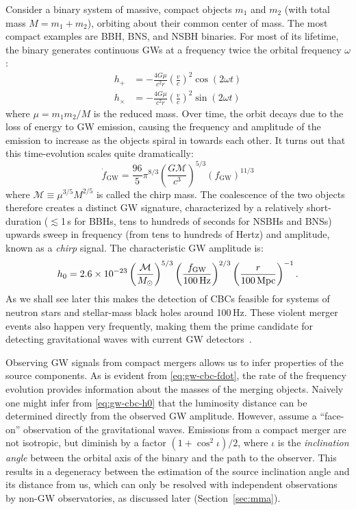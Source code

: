 Consider a binary system of massive, compact objects $m_1$ and $m_2$ (with total mass $M = m_1 + m_2$), orbiting about their common center of mass.
The most compact examples are \ac{BBH}, \ac{BNS}, and \ac{NSBH} binaries.
For most of its lifetime, the binary generates continuous \acp{GW} at a frequency twice the orbital frequency $\omega$:
\begin{align}
	\label{eq:gw-cbc-hplus}
	h_+ &= -\frac{4 G \mu}{c^2 r} \left(\frac{v}{c}\right)^2 \cos (2 \omega t) \\
	\label{eq:gw-cbc-hcross}
	h_{\times} &= -\frac{4 G \mu}{c^2 r} \left(\frac{v}{c}\right)^2 \sin (2 \omega t)
\end{align}
where $\mu = m_1 m_2 / M$ is the reduced mass.
Over time, the orbit decays due to the loss of energy to \ac{GW} emission, causing the frequency and amplitude of the emission to increase as the objects spiral in towards each other.
It turns out that this time-evolution scales quite dramatically:
\begin{equation}\label{eq:gw-cbc-fdot}
	\dot{f}_{\textrm{GW}} = \frac{96}{5}\pi^{8/3} \left(\frac{G \mathcal{M}}{c^3}\right)^{5/3} (f_{\textrm{GW}})^{11/3}
\end{equation}
where $\mathcal{M} \equiv \mu^{3/5} M^{2/5}$ is called the chirp mass.
The coalescence of the two objects therefore creates a distinct \ac{GW} signature, characterized by a relatively short-duration ($\lesssim$1\,s for \acp{BBH}, tens to hundreds of seconds for \acp{NSBH} and \acp{BNS}) upwards sweep in frequency (from tens to hundreds of Hertz) and amplitude, known as a \textit{chirp} signal.
The characteristic GW amplitude is:
\begin{equation}\label{eq:gw-cbc-h0}
	h_0 = 2.6 \times 10^{-23} \left( \frac{\mathcal{M}}{M_{\odot}} \right)^{5/3} \left( \frac{f_{\mathrm{GW}}}{100\,\mathrm{Hz}} \right)^{2/3} \left( \frac{r}{100\,\mathrm{Mpc}} \right)^{-1}.
\end{equation}
As we shall see later this makes the detection of \acp{CBC} feasible for systems of neutron stars and stellar-mass black holes around 100\,Hz.
These violent merger events also happen very frequently, making them the prime candidate for detecting gravitational waves with current GW detectors~\cite{aLIGO_prospects}.

Observing GW signals from compact mergers allows us to infer properties of the source components.
As is evident from \cref{eq:gw-cbc-fdot}, the rate of the frequency evolution provides information about the masses of the merging objects.
Naively one might infer from \cref{eq:gw-cbc-h0} that the luminosity distance can be determined directly from the observed GW amplitude.
However,  assume a ``face-on'' observation of the gravitational waves.
Emissions from a compact merger are not isotropic, but diminish by a factor $(1 + \cos^2 \iota) / 2$, where $\iota$ is the \textit{inclination angle} between the orbital axis of the binary and the path to the observer.
This results in a degeneracy between the estimation of the source inclination angle and its distance from us, which can only be resolved with independent observations by non-GW observatories, as discussed later (Section~\ref{sec:mma}).

